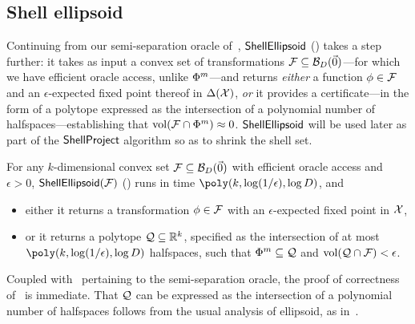 \subsection{Shell ellipsoid}
\label{sec:shellellips}

Continuing from our semi-separation oracle of~, $\textsf{ShellEllipsoid}$ () takes a step further: it takes as input a convex set of transformations ${\mathcal{F}} \subseteq {\mathcal{B}}_D(\vec{0})$---for which we have efficient oracle access, unlike $\Phi^m$---and returns \emph{either} a function $\phi \in {\mathcal{F}}$ and an $\epsilon$-expected fixed point thereof in $\Delta({\mathcal{X}})$, \emph{or} it provides a certificate---in the form of a polytope expressed as the intersection of a polynomial number of halfspaces---establishing that $\operatorname*{vol}({\mathcal{F}} \cap \Phi^m) \approx 0$. $\textsf{ShellEllipsoid}$ will be used later as part of the $\textsf{ShellProject}$ algorithm so as to shrink the shell set.

\begin{lemma}
    \label{lemma:shellellipsoid}
    For any $k$-dimensional convex set ${\mathcal{F}} \subseteq {\mathcal{B}}_{D}(\vec{0})$ with efficient oracle access and $\epsilon > 0$, $\textsf{ShellEllipsoid}({\mathcal{F}})$ () runs in time $\poly(k, \log(1/\epsilon), \log D)$, and 
    \begin{itemize}
        \item either it returns a transformation $\phi \in {\mathcal{F}}$ with an $\epsilon$-expected fixed point in ${\mathcal{X}}$,
        \item or it returns a polytope ${\mathcal{Q}} \subseteq \mathbb R^k$, specified as the intersection of at most $\poly( k, \log(1/\epsilon), \log D)$ halfspaces, such that $\Phi^m \subseteq {\mathcal{Q}}$ and $\operatorname*{vol}({\mathcal{Q}} \cap {\mathcal{F}}) < \epsilon$.
    \end{itemize}
\end{lemma}

Coupled with~ pertaining to the semi-separation oracle, the proof of correctness of~ is immediate. That ${\mathcal{Q}}$ can be expressed as the intersection of a polynomial number of halfspaces follows from the usual analysis of ellipsoid, as in~\citet[Lemma 4.2]{Daskalakis24:Efficient}.

